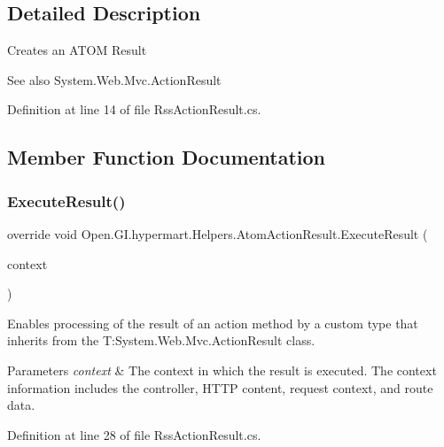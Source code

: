 \subsection{Detailed Description}
Creates an A\+T\+OM Result 

\begin{DoxySeeAlso}{See also}
System.\+Web.\+Mvc.\+Action\+Result


\end{DoxySeeAlso}


Definition at line 14 of file Rss\+Action\+Result.\+cs.



\subsection{Member Function Documentation}
\mbox{\label{class_open_1_1_g_i_1_1hypermart_1_1_helpers_1_1_atom_action_result_a525b622f00e4c2294a4fedb438273981}} 
\subsubsection{Execute\+Result()}
{\footnotesize\ttfamily override void Open.\+G\+I.\+hypermart.\+Helpers.\+Atom\+Action\+Result.\+Execute\+Result (\begin{DoxyParamCaption}\item[{Controller\+Context}]{context }\end{DoxyParamCaption})}



Enables processing of the result of an action method by a custom type that inherits from the T\+:\+System.\+Web.\+Mvc.\+Action\+Result class. 


\begin{DoxyParams}{Parameters}
{\em context} & The context in which the result is executed. The context information includes the controller, H\+T\+TP content, request context, and route data.\\
\hline
\end{DoxyParams}


Definition at line 28 of file Rss\+Action\+Result.\+cs.




